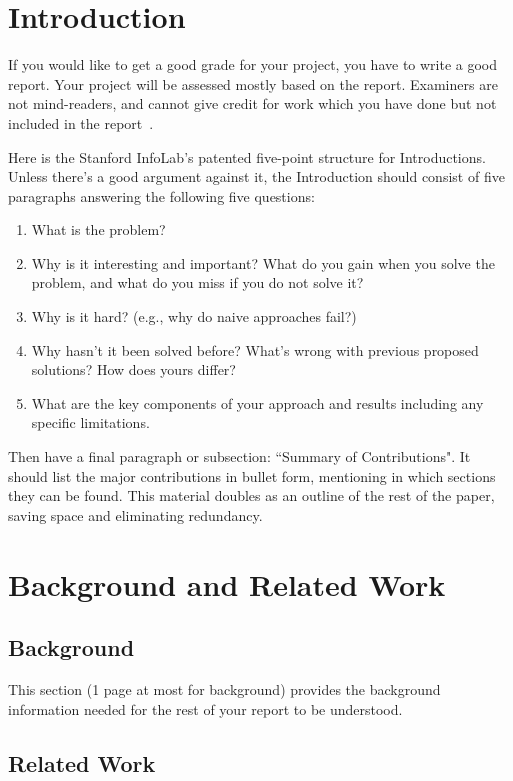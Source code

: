 \documentclass{winslabreport}
\begin{document}
\tableofcontents
\listoffigures
\listoftables
\body

\section{Introduction}

If you would like to get a good grade for your project, you have to write a good report.  Your project will be assessed mostly based on the report. Examiners are not mind-readers, and cannot give credit for work which you have done but not included in the report~\cite{York2017}.

Here is the Stanford InfoLab's patented five-point structure for Introductions. Unless there's a good argument against it, the Introduction should consist of five paragraphs answering the following five questions:
\begin{enumerate}
\item What is the problem?
\item Why is it interesting and important? What do you gain when you solve the problem, and what do you miss if you do not solve it?
\item Why is it hard? (e.g., why do naive approaches fail?)
\item Why hasn't it been solved before? What's wrong with previous proposed solutions? How does yours differ?
\item What are the key components of your approach and results including any specific limitations.
\end{enumerate}

Then have a final paragraph or subsection: ``Summary of Contributions". It should list the major contributions in bullet form, mentioning in which sections they can be found. This material doubles as an outline of the rest of the paper, saving space and eliminating redundancy.


\section{Background and Related Work}

\subsection{Background}

This section (1 page at most for background) provides the background information needed for the rest of your report to be understood. 

\subsection{Related Work}
\end{document}
